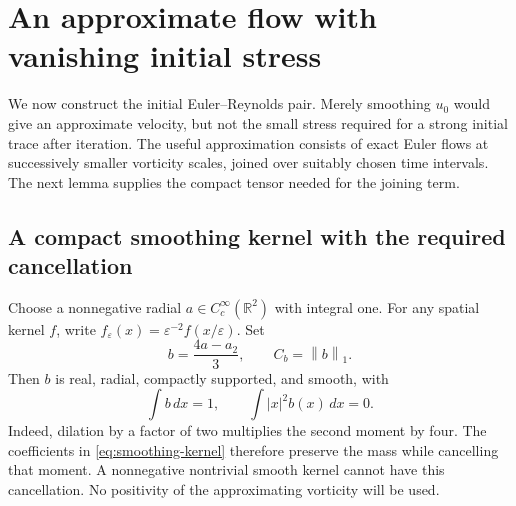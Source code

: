 \documentclass[11pt,a4paper,reqno]{amsart}
\theoremstyle{plain}
\theoremstyle{definition}
\theoremstyle{remark}
\numberwithin{equation}{section}
\newcommand{\R}{\mathbb R}
\newcommand{\norm}[2]{\left\|#1\right\|_{#2}}
\newcommand{\dd}{\,dx}
\begin{document}
\section{An approximate flow with vanishing initial stress}\label{sec:seed}

We now construct the initial Euler--Reynolds pair. Merely smoothing
$u_0$ would give an approximate velocity, but not the small stress
required for a strong initial trace after iteration. The useful
approximation consists of exact Euler flows at successively smaller
vorticity scales, joined over suitably chosen time intervals. The
next lemma supplies the compact tensor needed for the joining term.

\subsection{A compact smoothing kernel with the required cancellation}

Choose a nonnegative radial $a\in C_c^\infty(\R^2)$ with integral one.
For any spatial kernel $f$, write $f_\varepsilon(x)=
\varepsilon^{-2}f(x/\varepsilon)$. Set
\begin{equation}\label{eq:smoothing-kernel}
 b=\frac{4a-a_2}{3},\qquad C_b=\norm b1.
\end{equation}
Then $b$ is real, radial, compactly supported, and smooth, with
\begin{equation}\label{eq:smoothing-moments}
 \int b\dd=1,\qquad \int |x|^2b(x)\dd=0.
\end{equation}
Indeed, dilation by a factor of two multiplies the second moment
by four. The coefficients in \eqref{eq:smoothing-kernel} therefore
preserve the mass while cancelling that moment. A nonnegative
nontrivial smooth kernel cannot have this cancellation. No positivity
of the approximating vorticity will be used.
\end{document}
